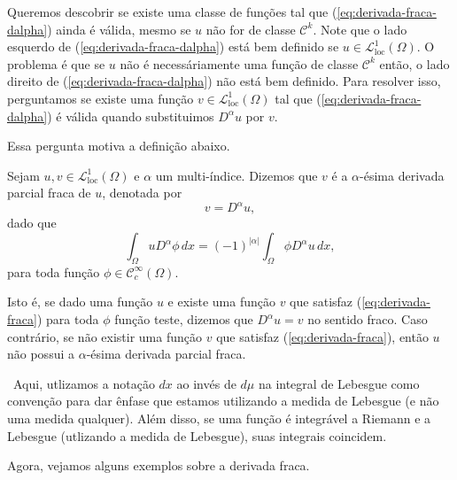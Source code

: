 \documentclass[a4paper, 11pt]{book}
\theoremstyle{definition}
\newcommand{\obs}{\noindent{\textbf{\textcolor{black}{\sffamily Observação:}}}~}
\newcommand{\cC}{\mathcal{C}}
\newcommand{\cL}{\mathcal{L}}
\begin{document}
Queremos descobrir se existe uma classe de funções tal que (\ref{eq:derivada-fraca-dalpha}) ainda é válida, mesmo se $u$ não for de classe $\cC ^k$. Note que o lado esquerdo de (\ref{eq:derivada-fraca-dalpha}) está bem definido se $u \in \cL^1_{\mathrm{loc}}(\Omega)$.
O problema é que se $u$ não é necessáriamente uma função de classe $\cC^k$ então, o lado direito de (\ref{eq:derivada-fraca-dalpha}) não está bem definido. Para resolver isso, perguntamos se existe uma função $v \in \cL^1_{\mathrm{loc}}(\Omega)$ tal que (\ref{eq:derivada-fraca-dalpha}) é válida quando substituimos $D^\alpha u$ por $v$.

Essa pergunta motiva a definição abaixo.

\begin{dbox}
    Sejam $u,v \in \cL^1_{\mathrm{loc}}(\Omega)$ e $\alpha$ um multi-índice. Dizemos que $v$ é a $\alpha$-ésima derivada parcial fraca de $u$, denotada por
    \[
        v = D^\alpha u,
    \]
    dado que
    \begin{equation} \label{eq:derivada-fraca}
        \int_\Omega u D^\alpha \phi \,dx = (-1)^{|\alpha|} \int_\Omega \phi D^\alpha u\,dx,
    \end{equation}
    para toda função $\phi \in \cC ^\infty_c(\Omega)$.
\end{dbox}

Isto é, se dado uma função $u$ e existe uma função $v$ que satisfaz (\ref{eq:derivada-fraca}) para toda $\phi$ função teste, dizemos que $D^\alpha u = v$ no sentido fraco.
Caso contrário, se não existir uma função $v$ que satisfaz (\ref{eq:derivada-fraca}), então $u$ não possui a $\alpha$-ésima derivada parcial fraca.

\obs Aqui, utlizamos a notação $dx$ ao invés de $d\mu$ na integral de Lebesgue como convenção para dar ênfase que estamos utilizando a medida de Lebesgue (e não uma medida qualquer).
Além disso, se uma função é integrável a Riemann e a Lebesgue (utlizando a medida de Lebesgue), suas integrais coincidem.

Agora, vejamos alguns exemplos sobre a derivada fraca.
\end{document}
